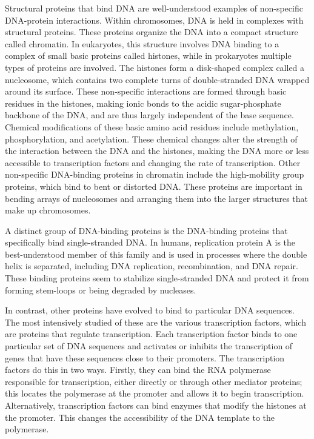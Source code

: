 Structural proteins that bind DNA are well-understood examples of non-specific DNA-protein interactions. Within chromosomes, DNA is held in complexes with structural proteins. These proteins organize the DNA into a compact structure called chromatin. In eukaryotes, this structure involves DNA binding to a complex of small basic proteins called histones, while in prokaryotes multiple types of proteins are involved. The histones form a disk-shaped complex called a nucleosome, which contains two complete turns of double-stranded DNA wrapped around its surface. These non-specific interactions are formed through basic residues in the histones, making ionic bonds to the acidic sugar-phosphate backbone of the DNA, and are thus largely independent of the base sequence. Chemical modifications of these basic amino acid residues include methylation, phosphorylation, and acetylation. These chemical changes alter the strength of the interaction between the DNA and the histones, making the DNA more or less accessible to transcription factors and changing the rate of transcription. Other non-specific DNA-binding proteins in chromatin include the high-mobility group proteins, which bind to bent or distorted DNA. These proteins are important in bending arrays of nucleosomes and arranging them into the larger structures that make up chromosomes.

A distinct group of DNA-binding proteins is the DNA-binding proteins that specifically bind single-stranded DNA. In humans, replication protein A is the best-understood member of this family and is used in processes where the double helix is separated, including DNA replication, recombination, and DNA repair. These binding proteins seem to stabilize single-stranded DNA and protect it from forming stem-loops or being degraded by nucleases.

In contrast, other proteins have evolved to bind to particular DNA sequences. The most intensively studied of these are the various transcription factors, which are proteins that regulate transcription. Each transcription factor binds to one particular set of DNA sequences and activates or inhibits the transcription of genes that have these sequences close to their promoters. The transcription factors do this in two ways. Firstly, they can bind the RNA polymerase responsible for transcription, either directly or through other mediator proteins; this locates the polymerase at the promoter and allows it to begin transcription. Alternatively, transcription factors can bind enzymes that modify the histones at the promoter. This changes the accessibility of the DNA template to the polymerase.

